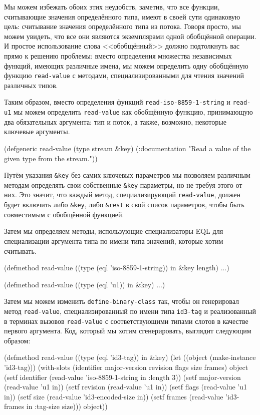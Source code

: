 Мы можем избежать обоих этих неудобств, заметив, что все функции, считывающие значения
определённого типа, имеют в своей сути одинаковую цель: считывание значения определённого
типа из потока. Говоря просто, мы можем увидеть, что все они являются экземплярами одной
обобщённой операции. И простое использование слова <<обобщённый>> должно подтолкнуть вас
прямо к решению проблемы: вместо определения множества независимых функций, имеющих
различные имена, мы можем определить одну обобщённую функцию \lstinline{read-value} с методами,
специализированными для чтения значений различных типов.

Таким образом, вместо определения функций \lstinline{read-iso-8859-1-string} и \lstinline{read-u1}
мы можем определить \lstinline{read-value} как обобщённую функцию, принимающую два обязательных
аргумента: тип и поток, а также, возможно, некоторые ключевые аргументы.

\begin{myverb}
(defgeneric read-value (type stream &key)
  (:documentation "Read a value of the given type from the stream."))
\end{myverb}

Путём указания \lstinline!&key! без самих ключевых параметров мы позволяем различным
методам определять свои собственные \lstinline!&key! параметры, но не требуя этого от
них. Это значит, что каждый метод, специализирующий \lstinline{read-value}, должен будет
включить либо \lstinline!&key!, либо \lstinline!&rest! в свой список параметров, чтобы
быть совместимым с обобщённой функцией.

Затем мы определяем методы, использующие специализаторы EQL для специализации аргумента
типа по имени типа значений, которые хотим считывать.

\begin{myverb}
(defmethod read-value ((type (eql 'iso-8859-1-string)) in &key length) ...)

(defmethod read-value ((type (eql 'u1)) in &key) ...)
\end{myverb}

Затем мы можем изменить \lstinline{define-binary-class} так, чтобы он генерировал метод
\lstinline{read-value}, специализированный по имени типа \lstinline{id3-tag} и реализованный в
терминах вызовов \lstinline{read-value} с соответствующими типами слотов в качестве первого
аргумента. Код, который мы хотим сгенерировать, выглядит следующим образом:

\begin{myverb}
(defmethod read-value ((type (eql 'id3-tag)) in &key)
  (let ((object (make-instance 'id3-tag)))
    (with-slots (identifier major-version revision flags size frames) object
      (setf identifier    (read-value 'iso-8859-1-string in :length 3))
      (setf major-version (read-value 'u1 in))
      (setf revision      (read-value 'u1 in))
      (setf flags         (read-value 'u1 in))
      (setf size          (read-value 'id3-encoded-size in))
      (setf frames        (read-value 'id3-frames in :tag-size size)))
    object))
\end{myverb}

